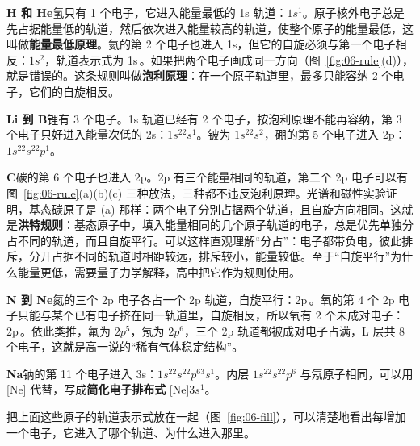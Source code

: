 \textbf{H 和 He}\quad 氢只有 1 个电子，它进入能量最低的 1s 轨道：$1s^1$。原子核外电子总是先占据能量低的轨道，然后依次进入能量较高的轨道，使整个原子的能量最低，这叫做\textbf{能量最低原理}。氦的第 2 个电子也进入 1s，但它的自旋必须与第一个电子相反：$1s^2$，轨道表示式为 1s\,。如果把两个电子画成同一方向（图~\ref{fig:06-rule}(d)），就是错误的。这条规则叫做\textbf{泡利原理}：在一个原子轨道里，最多只能容纳 2 个电子，它们的自旋相反。

\textbf{Li 到 B}\quad 锂有 3 个电子。1s 轨道已经有 2 个电子，按泡利原理不能再容纳，第 3 个电子只好进入能量次低的 2s：$1s^22s^1$。铍为 $1s^22s^2$，硼的第 5 个电子进入 2p：$1s^22s^22p^1$。

\textbf{C}\quad 碳的第 6 个电子也进入 2p。2p 有三个能量相同的轨道，第二个 2p 电子可以有图~\ref{fig:06-rule}(a)(b)(c) 三种放法，三种都不违反泡利原理。光谱和磁性实验证明，基态碳原子是 (a) 那样：两个电子分别占据两个轨道，且自旋方向相同。这就是\textbf{洪特规则}：基态原子中，填入能量相同的几个原子轨道的电子，总是优先单独分占不同的轨道，而且自旋平行。可以这样直观理解“分占”：电子都带负电，彼此排斥，分开占据不同的轨道时相距较远，排斥较小，能量较低。至于“自旋平行”为什么能量更低，需要量子力学解释，高中把它作为规则使用。


\textbf{N 到 Ne}\quad 氮的三个 2p 电子各占一个 2p 轨道，自旋平行：2p\,。氧的第 4 个 2p 电子只能与某个已有电子挤在同一轨道里，自旋相反，所以氧有 2 个未成对电子：2p\,。依此类推，氟为 $2p^5$，氖为 $2p^6$，三个 2p 轨道都被成对电子占满，L 层共 8 个电子，这就是高一说的“稀有气体稳定结构”。

\textbf{Na}\quad 钠的第 11 个电子进入 3s：$1s^22s^22p^63s^1$。内层 $1s^22s^22p^6$ 与氖原子相同，可以用 [Ne] 代替，写成\textbf{简化电子排布式} [Ne]$3s^1$。

把上面这些原子的轨道表示式放在一起（图~\ref{fig:06-fill}），可以清楚地看出每增加一个电子，它进入了哪个轨道、为什么进入那里。

